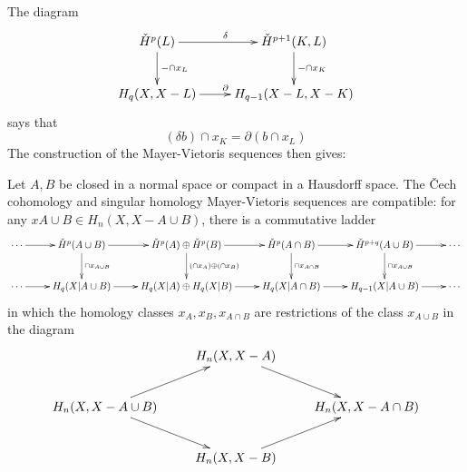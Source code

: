 The diagram
\begin{equation*}
\xymatrix{
	\cHH^p(L)\ar[r]^\delta\ar[d]^{-\cap x_L} & \cHH^{p+1}(K,L)\ar[d]^{-\cap x_K}\\
	H_q(X,X-L)\ar[r]^{\partial} & H_{q-1}(X-L,X-K)
}
\end{equation*}
says that
\begin{equation*}
(\delta b)\cap x_K=\partial(b\cap x_L)
\end{equation*}
The construction of the Mayer-Vietoris sequences then gives:
\begin{theorem}
\label{thm-mayer-vietoris-ladder}
Let $A, B$ be closed in a normal space or compact in a Hausdorff space. 
The \v{C}ech cohomology and singular homology Mayer-Vietoris sequences are 
compatible: for any $x{A\cup B}\in H_n(X,X-A\cup B)$, 
there is a commutative ladder
\begin{equation*}
\xymatrix{
\cdots \ar[r] & \cHH^p(A\cup B)\ar[r]\ar[d]^{\cap x_{A\cup B}} & 
\cHH^p(A)\oplus \cHH^p(B)\ar[r]\ar[d]^{(\cap x_A)\oplus(\cap x_B)} & 
\cHH^p(A\cap B)\ar[r]\ar[d]^{\cap x_{A\cap B}} & 
\cHH^{p+q}(A\cup B)\ar[r]\ar[d]^{\cap x_{A\cup B}} & \cdots\\
\cdots \ar[r] & H_q(X|A\cup B)\ar[r]& H_q(X|A)\oplus H_q(X|B)\ar[r]& H_q(X|A\cap B)\ar[r]& H_{q-1}(X|A\cup B)\ar[r]&\cdots
}
\end{equation*}
in which the  homology classes $x_A,x_B,x_{A\cap B}$  
are restrictions of the class $x_{A\cup B}$ in the diagram
\begin{equation*}
\xymatrix{
	 & H_n(X,X-A)\ar[dr] & \\
	H_n(X,X-A\cup B)\ar[ur]\ar[dr] & & H_n(X,X-A\cap B)\\
	 & H_n(X,X-B)\ar[ur]
}
\end{equation*}
\end{theorem}

